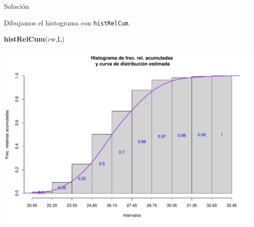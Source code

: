 \documentclass[
  ignorenonframetext,
]{beamer}
\newenvironment{Shaded}{\begin{snugshade}}{\end{snugshade}}
\newcommand{\KeywordTok}[1]{\textcolor[rgb]{0.13,0.29,0.53}{\textbf{#1}}}
\newcommand{\NormalTok}[1]{#1}
\begin{document}
\begin{frame}[fragile]{Solución}
\protect\hypertarget{soluciuxf3n-47}{}

Dibujamos el histograma con \texttt{histRelCum}.

\begin{Shaded}
\begin{Highlighting}[]
\KeywordTok{histRelCum}\NormalTok{(cw,L)}
\end{Highlighting}
\end{Shaded}

\includegraphics{Tema9.-Agrupacion_datos_cuantitativos_files/figure-beamer/unnamed-chunk-62-1.pdf}

\end{frame}
\end{document}
